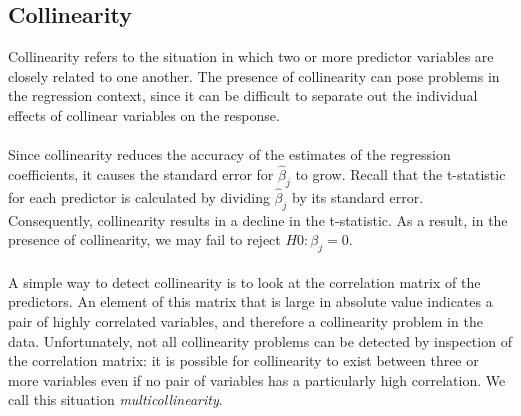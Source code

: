 \subsection{Collinearity}
Collinearity refers to the situation in which two or more predictor variables are closely related to one another. The presence of collinearity can pose problems in the regression context, since it can be difficult to separate out the individual effects of collinear variables on the response.\\\\
Since collinearity reduces the accuracy of the estimates of the regression coefficients, it causes the standard error for $\hat\beta_j$ to grow. Recall that the t-statistic for each predictor is calculated by dividing $\hat\beta_j$ by its standard error. Consequently, collinearity results in a decline in the t-statistic. As a result, in the presence of collinearity, we may fail to reject $H0 : \beta_j = 0$.\\\\
A simple way to detect collinearity is to look at the correlation matrix of the predictors. An element of this matrix that is large in absolute value indicates a pair of highly correlated variables, and therefore a collinearity problem in the data. Unfortunately, not all collinearity problems can be detected by inspection of the correlation matrix: it is possible for collinearity to exist between three or more variables even if no pair of variables has a particularly high correlation. We call this situation \textit{multicollinearity}.
